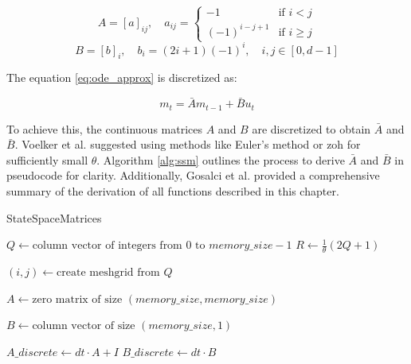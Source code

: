 \begin{equation}
\label{eq:a_bar}
    A = [a]_{ij}, \quad a_{ij} = \begin{cases}
    -1 & \text{if } i < j \\
    (-1)^{i-j+1} & \text{if } i \geq j
    \end{cases}
\end{equation}
\begin{equation}
\label{eq:b_bar}
    B = [b]_i, \quad b_i = (2i + 1)(-1)^i, \quad i, j \in [0, d-1]
\end{equation}

The equation \eqref{eq:ode_approx} is discretized as:

\[
m_t = \bar{A}m_{t-1} + \bar{B}u_t
\]

To achieve this, the continuous matrices \( A \) and \( B \) are discretized to obtain \( \bar{A} \) and \( \bar{B} \). Voelker et al. suggested using methods like Euler's method or \gls*{zoh} for sufficiently small \( \theta \). Algorithm \ref{alg:ssm} outlines the process to derive \( \bar{A} \) and \( \bar{B} \) in pseudocode for clarity. Additionally, Gosalci et al. \cite{gosalci} provided a comprehensive summary of the derivation of all functions described in this chapter.


\begin{algorithm}[H]
\caption{StateSpaceMatrices}
\label{alg:ssm}
$Q \gets \text{column vector of integers from } 0 \text{ to } memory\_size-1$\;
$R \gets \frac{1}{\theta}(2 Q + 1)$\;

$(i, j) \gets \text{create meshgrid from } Q$\;

$A \gets \text{zero matrix of size } (memory\_size, memory\_size)$\;

$B \gets \text{column vector of size } (memory\_size, 1)$\;

$A\_discrete \gets dt \cdot A + I$\;
$B\_discrete \gets dt \cdot B$\;

\end{algorithm}



